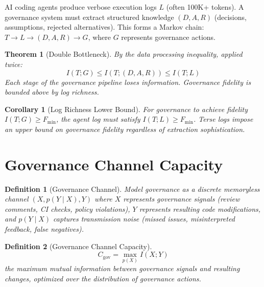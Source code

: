 \documentclass[11pt, a4paper, copyright]{googledeepmind}
\newtheorem{definition}{Definition}[section]
\newtheorem{theorem}{Theorem}[section]
\newtheorem{corollary}{Corollary}[section]
\begin{document}
AI coding agents produce verbose execution logs $L$ (often 100K+ tokens). A governance system must extract structured knowledge $(D, A, R)$ (decisions, assumptions, rejected alternatives). This forms a Markov chain: $T \to L \to (D, A, R) \to G$, where $G$ represents governance actions.

\begin{theorem}[Double Bottleneck]
\label{thm:bottleneck}
By the data processing inequality, applied twice:
\begin{equation}
    I(T; G) \leq I(T; (D, A, R)) \leq I(T; L)
\end{equation}
Each stage of the governance pipeline loses information. Governance fidelity is bounded above by log richness.
\end{theorem}

\begin{corollary}[Log Richness Lower Bound]
For governance to achieve fidelity $I(T; G) \geq F_{\min}$, the agent log must satisfy $I(T; L) \geq F_{\min}$. Terse logs impose an upper bound on governance fidelity regardless of extraction sophistication.
\end{corollary}


\section{Governance Channel Capacity}
\label{sec:capacity}

\begin{definition}[Governance Channel]
Model governance as a discrete memoryless channel $(X, p(Y \mid X), Y)$ where $X$ represents governance signals (review comments, CI checks, policy violations), $Y$ represents resulting code modifications, and $p(Y \mid X)$ captures transmission noise (missed issues, misinterpreted feedback, false negatives).
\end{definition}

\begin{definition}[Governance Channel Capacity]
\begin{equation}
    C_{\mathrm{gov}} = \max_{p(X)} I(X; Y)
\end{equation}
the maximum mutual information between governance signals and resulting changes, optimized over the distribution of governance actions.
\end{definition}
\end{document}
